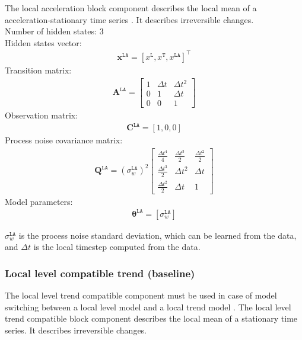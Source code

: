 The local acceleration block component describes the local mean of a acceleration-stationary time series \cite{STC:STC2035}. 
It describes irreversible changes.\\

\noindent
Number of hidden states: 3\\

Hidden states vector: 
\begin{gather*}
\mathbf{x}^{\mathtt{LA}} = [x^{\mathtt{L}}, x^{\mathtt{T}} ,  x^{\mathtt{LA}}]^{\intercal}
\end{gather*}
Transition matrix: 
\begin{gather*}
\mathbf{A}^{\mathtt{LA}}=  \left[\begin{array}{ccc}1 &\Delta t&\Delta t^{2}\\0&1&\Delta t\\0&0&1\end{array}\right]
\end{gather*}
Observation matrix: 
\begin{gather*}
\mathbf{C}^{\mathtt{LA}}=[1, 0, 0]
\end{gather*}
Process noise covariance matrix: 
\begin{gather*}
\mathbf{Q}^{\mathtt{LA}}=(\sigma_{w}^{\mathtt{LA}})^{2}\left[\begin{array}{ccc}\tfrac{\Delta t^{4}}{4} &\tfrac{\Delta t^{3}}{2} &\tfrac{\Delta t^{2}}{2}\\\tfrac{\Delta t^{3}}{2} &\Delta t^{2}&\Delta t\\\tfrac{\Delta t^{2}}{2}&\Delta t&1\end{array}\right]
\end{gather*}
Model parameters: 
\begin{gather*}
\bm\theta^{\mathtt{LA}}=[\sigma_{w}^{\mathtt{LA}} ]
\end{gather*}

\noindent
$\sigma_{w}^{\mathtt{LA}}$ is the process noise standard deviation, which can be learned from the data, and $\Delta t$ is the local timestep computed from the data.



\subsubsection{Local level compatible trend (baseline)}

The local level trend compatible component must be used in case of model switching between a local level model and a local trend model \cite{Nguyen2018}.
The local level trend compatible block component describes the local mean of a stationary time series. 
It describes irreversible changes.\\

